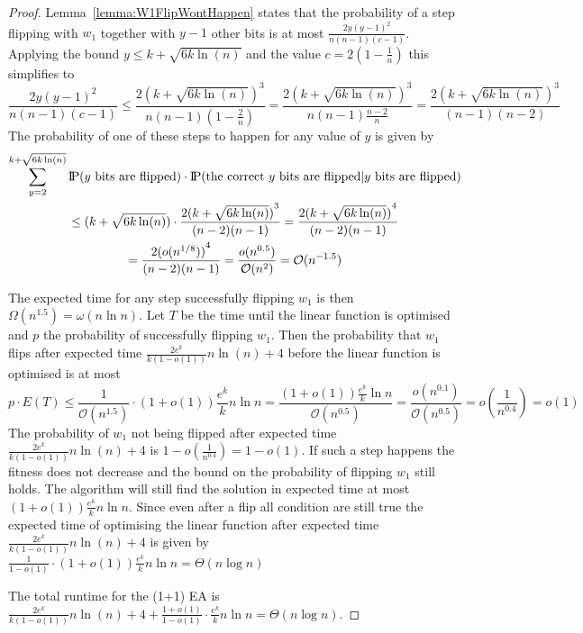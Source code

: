 \begin{proof}
    Lemma~\ref{lemma:W1FlipWontHappen} states that the probability of a step flipping with $w_1$ together with $y-1$ other bits is at most $\frac{2y{(y-1)}^2}{n(n-1)(c-1)}$.
    Applying the bound $y\le k+\sqrt{6k\ln(n)}$ and the value $c=2(1-\frac{1}{n})$ this simplifies to
    \[
        \frac{2y{(y-1)}^2}{n(n-1)(c-1)}
        \le\frac{2{(k+\sqrt{6k\ln(n)})}^3}{n(n-1)(1-\frac{2}{n})}
        =\frac{2{(k+\sqrt{6k\ln(n)})}^3}{n(n-1)\frac{n-2}{n}}
        =\frac{2{(k+\sqrt{6k\ln(n)})}^3}{(n-1)(n-2)}
    \]
    The probability of one of these steps to happen for any value of $y$ is given by
    \begin{gather}
        \nonumber \sum_{y=2}^{k+\sqrt{6k\ln(n)}}{\text{I\kern-0.15em P}(y \text{ bits are flipped})\cdot\text{I\kern-0.15em P}(\text{the correct $y$ bits are flipped} | y \text{ bits are flipped})}\\
        \nonumber \le ({k+\sqrt{6k\ln(n)}})\cdot\frac{2{(k+\sqrt{6k\ln(n)})}^{3}}{(n-2)(n-1)}
        = \frac{2{(k+\sqrt{6k\ln(n)})}^{4}}{(n-2)(n-1)}\\ \nonumber
        = \frac{2{(o({n}^{1/8}))}^{4}}{(n-2)(n-1)}
        = \frac{o(n^{0.5})}{\mathcal{O}(n^{2})}
        = \mathcal{O}(n^{-1.5})
    \end{gather}

    The expected time for any step successfully flipping $w_1$ is then $\Omega(n^{1.5})=\omega(n\ln n)$.
    Let $T$ be the time until the linear function is optimised and $p$ the probability of successfully flipping $w_1$.
    Then the probability that $w_1$ flips after expected time $\frac{2e^k}{k(1-o(1))}n\ln(n)+4$ before the linear function is optimised is at most
    \[
        p\cdot E(T) \le \frac{1}{\mathcal{O}(n^{1.5})}\cdot(1+o(1))\frac{e^k}{k}n\ln n
        =\frac{(1+o(1))\frac{e^k}{k}\ln n}{\mathcal{O}(n^{0.5})}
        =\frac{o(n^{0.1})}{\mathcal{O}(n^{0.5})}
        =o(\frac{1}{n^{0.4}})=o(1)\]
    The probability of $w_1$ not being flipped after expected time $\frac{2e^k}{k(1-o(1))}n\ln(n)+4$ is \(1-o(\frac{1}{n^{0.4}})=1-o(1)\).
    If such a step happens the fitness does not decrease and the bound on the probability of flipping $w_1$ still holds.
    The algorithm will still find the solution in expected time at most $(1+o(1))\frac{e^k}{k}n\ln n$.
    Since even after a flip all condition are still true the expected time of optimising the linear function after expected time $\frac{2e^k}{k(1-o(1))}n\ln(n)+4$ is given by \(\frac{1}{1-o(1)}\cdot(1+o(1))\frac{e^k}{k}n\ln n=\Theta(n\log{}n)\)

    The total runtime for the (1+1) EA is $\frac{2e^k}{k(1-o(1))}n\ln(n)+4 + \frac{1+o(1)}{1-o(1)}\cdot \frac{e^k}{k}n\ln n =\Theta(n\log{}n)$.

\end{proof}

